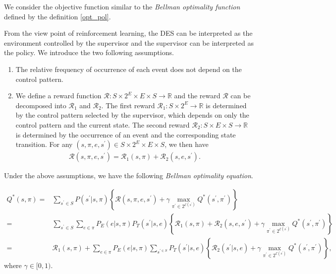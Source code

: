 We consider the objective function similar to the {\it Bellman optimality function} defined by the definition \ref{opt_pol}.
\begin{definition}

  From the view point of reinforcement learning, the DES can be interpreted as the environment controlled by the supervisor and the supervisor can be interpreted as the policy. We introduce the two following assumptions.

  \begin{enumerate}
    \item The relative frequency of occurrence of each event does not depend on the control pattern.
    \item We define a reward function $\mathcal{R} : S \times 2^E \times E \times S \rightarrow \mathbb{R}$ and the reward $\mathcal{R}$ can be decomposed into $\mathcal{R}_1$ and $\mathcal{R}_2$. The first reward $\mathcal{R}_1 : S \times 2^E \rightarrow \mathbb{R}$ is determined by the control pattern selected by the supervisor, which depends on only the control pattern and the current state. The second reward $\mathcal{R}_2 : S \times E \times S \rightarrow \mathbb{R}$ is determined by the occurrence of an event and the corresponding state transition. For any $(s,\pi,e,s^{\prime}) \in S \times 2^E \times E \times S$, we then have
    \begin{align}
      \mathcal{R}(s,\pi,e,s^{\prime}) = \mathcal{R}_1(s,\pi) + \mathcal{R}_2(s,e,s^{\prime}).
    \end{align}
  \end{enumerate}
  Under the above assumptions, we have the following {\it Bellman optimality equation}.

  \begin{align}
    Q^{\ast}(s,\pi) = & \sum_{s^{\prime} \in S} P(s^{\prime}|s,\pi)\left \{ \mathcal{R}(s,\pi,e,s^{\prime}) + \gamma \max_{\pi^{\prime} \in 2^{\mathcal{E}(s^{\prime})}} Q^{\ast}(s^{\prime},\pi^{\prime}) \right \} \nonumber \\
    = & \sum_{s^{\prime} \in S} \sum_{e \in \pi} P_E(e|s,\pi) P_T(s^{\prime}|s,e) \left \{ \mathcal{R}_1(s,\pi) + \mathcal{R}_2(s,e,s^{\prime}) + \gamma \max_{\pi^{\prime} \in 2^{\mathcal{E}(s^{\prime})}} Q^{\ast}(s^{\prime},\pi^{\prime}) \right \} \nonumber \\
    = & \mathcal{R}_1(s,\pi) + \sum_{e \in \pi} P_E(e|s,\pi) \sum_{s^{\prime \in S}} P_T(s^{\prime}|s,e) \left \{ \mathcal{R}_2(s^{\prime}|s,e) + \gamma \max_{\pi^{\prime} \in 2^{\mathcal{E}(s^{\prime})}} Q^{\ast}(s^{\prime}, \pi^{\prime}) \right \},
  \end{align}
  where $\gamma \in [0,1)$.


\end{definition}
